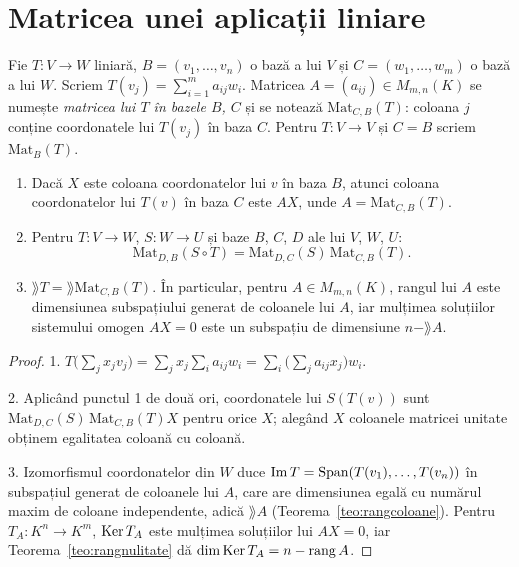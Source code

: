 \section{Matricea unei aplicații liniare}

\begin{definitie}
Fie $T:V\to W$ liniară, $B=(v_1,\dots,v_n)$ o bază a lui $V$ și $C=(w_1,\dots,w_m)$ o bază a lui $W$. Scriem $T(v_j)=\sum_{i=1}^ma_{ij}w_i$. Matricea $A=(a_{ij})\in M_{m,n}(K)$ se numește \emph{matricea lui $T$ în bazele $B$, $C$} și se notează $\mathrm{Mat}_{C,B}(T)$: coloana $j$ conține coordonatele lui $T(v_j)$ în baza $C$. Pentru $T:V\to V$ și $C=B$ scriem $\mathrm{Mat}_B(T)$.
\end{definitie}

\begin{propozitie}\label{prop:matriceaplicatie}
\begin{enumerate}
\item Dacă $X$ este coloana coordonatelor lui $v$ în baza $B$, atunci coloana coordonatelor lui $T(v)$ în baza $C$ este $AX$, unde $A=\mathrm{Mat}_{C,B}(T)$.
\item Pentru $T:V\to W$, $S:W\to U$ și baze $B$, $C$, $D$ ale lui $V$, $W$, $U$:
\[
\mathrm{Mat}_{D,B}(S\circ T)=\mathrm{Mat}_{D,C}(S)\,\mathrm{Mat}_{C,B}(T).
\]
\item $\rang T=\rang\mathrm{Mat}_{C,B}(T)$. În particular, pentru $A\in M_{m,n}(K)$, rangul lui $A$ este dimensiunea subspațiului generat de coloanele lui $A$, iar mulțimea soluțiilor sistemului omogen $AX=0$ este un subspațiu de dimensiune $n-\rang A$.
\end{enumerate}
\end{propozitie}

\begin{proof}
1. $T\bigl(\sum_jx_jv_j\bigr)=\sum_jx_j\sum_ia_{ij}w_i=\sum_i\bigl(\sum_ja_{ij}x_j\bigr)w_i$.

2. Aplicând punctul 1 de două ori, coordonatele lui $S(T(v))$ sunt $\mathrm{Mat}_{D,C}(S)\,\mathrm{Mat}_{C,B}(T)X$ pentru orice $X$; alegând $X$ coloanele matricei unitate obținem egalitatea coloană cu coloană.

3. Izomorfismul coordonatelor din $W$ duce $\operatorname{Im} T=\operatorname{Span}(T(v_1),\dots,T(v_n))$ în subspațiul generat de coloanele lui $A$, care are dimensiunea egală cu numărul maxim de coloane independente, adică $\rang A$ (Teorema~\ref{teo:rangcoloane}). Pentru $T_A:K^n\to K^m$, $\operatorname{Ker} T_A$ este mulțimea soluțiilor lui $AX=0$, iar Teorema~\ref{teo:rangnulitate} dă $\dim\operatorname{Ker} T_A=n-\operatorname{rang} A$.
\end{proof}

